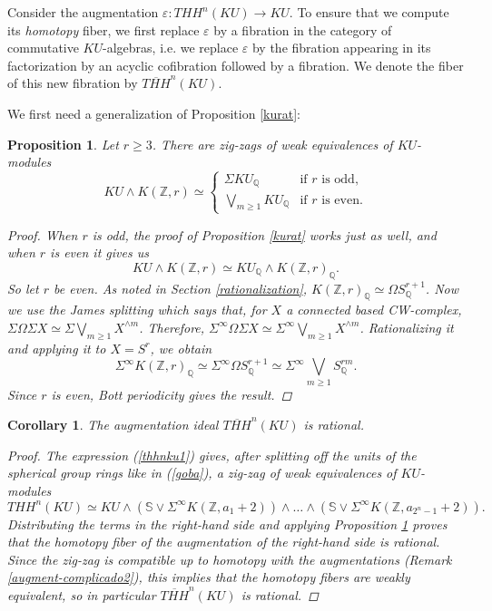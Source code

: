 \documentclass[a4paper,11pt]{amsart} %
\renewcommand{\epsilon}{\varepsilon}
\theoremstyle{definition} \newtheorem{defn}[equation]{Definition}
\theoremstyle{remark} \newtheorem{notation}[equation]{Notation}
\theoremstyle{plain} \newtheorem{teo}[equation]{Theorem}
\theoremstyle{plain} \newtheorem{lema}[equation]{Lemma}
\theoremstyle{plain} \newtheorem{prop}[equation]{Proposition}
\theoremstyle{plain} \newtheorem{corolario}[equation]{Corollary}
\theoremstyle{remark} \newtheorem{obs}[equation]{Remark}
\theoremstyle{remark} \newtheorem{sideobs}[equation]{Side remark}
\theoremstyle{remark} \newtheorem{ejercicio}[equation]{Exercise}
\theoremstyle{definition} \newtheorem{notn}[equation]{Notation}
\theoremstyle{remark} \newtheorem{ej}[equation]{Example}
\theoremstyle{remark} \newtheorem{contraej}[equation]{Counterexample}
\theoremstyle{plain} \newtheorem{conj}[equation]{Conjecture}
\renewcommand{\1}{\ensuremath{\mathbbm{1}}}
\newcommand{\Q}{\mathbb{Q}}
\renewcommand{\S}{\mathbb{S}}
\newcommand{\Z}{\mathbb{Z}}
\newcommand{\bprf}{\begin{proof}}
\newcommand{\eprf}{\end{proof}}
\newcommand{\bcor}{\begin{corolario}}
\newcommand{\ecor}{\end{corolario}}
\numberwithin{equation}{section}
\begin{document}
Consider the augmentation $\epsilon:THH^n(KU)\to KU$. To ensure that we compute its \emph{homotopy} fiber, we first replace $\epsilon$ by a fibration in the category of commutative $KU$-algebras, i.e. we replace $\epsilon$ by the fibration appearing in its factorization by an acyclic cofibration followed by a fibration. We denote the fiber of this new fibration by $\overline{THH}^n(KU)$.


%
%
%
%
%
%
%
%
%



We first need a generalization of Proposition \ref{kurat}:

\begin{prop} \label{lemgen} Let $r\geq 3$. There are zig-zags of weak equivalences of $KU$-modules
\[KU \wedge K(\Z,r) \simeq \begin{cases} \Sigma KU_\Q & \text{if } r \text{ is odd}, \\ \bigvee\limits_{m\geq 1} KU_\Q & \text{if } r \text{ is even}.\end{cases}\]
\bprf When $r$ is odd, the proof of Proposition \ref{kurat} works just as well, and when $r$ is even it gives us
\[KU \wedge K(\Z,r) \simeq KU_\Q \wedge K(\Z,r)_\Q.\]
So let $r$ be even. As noted in Section \ref{rationalization}, $K(\Z,r)_\Q \simeq \Omega S^{r+1}_\Q$. Now we use the James splitting which says that, for $X$ a connected based CW-complex, $\Sigma \Omega \Sigma X \simeq \Sigma \bigvee_{m\geq 1} X^{\wedge m}$. %
Therefore, %
$\Sigma^\infty \Omega \Sigma X \simeq \Sigma^\infty \bigvee_{m\geq 1} X^{\wedge m}$. Rationalizing it and applying it to $X=S^r$, we obtain
\[\Sigma^\infty K(\Z,r)_\Q \simeq \Sigma^\infty \Omega S^{r+1}_\Q \simeq \Sigma^\infty \bigvee_{m\geq 1} S^{rm}_\Q.\] 
Since $r$ is even, Bott periodicity gives the result.
\eprf
\end{prop}

\bcor \label{hocs} The augmentation ideal $\overline{THH}^n(KU)$ is rational.
\bprf The expression (\ref{thhnku1}) gives, after splitting off the units of the spherical group rings like in (\ref{goba}), a zig-zag of weak equivalences of $KU$-modules
\begin{equation} \label{kol} THH^n(KU) \simeq KU \wedge (\S \vee \Sigma^\infty K(\Z,a_1+2)) \wedge \dots \wedge  (\S \vee \Sigma^\infty K(\Z,a_{2^n-1}+2)). \end{equation}
%
Distributing the terms in the right-hand side and applying Proposition \ref{lemgen} proves that the homotopy fiber of the augmentation of the right-hand side is rational. 
Since the zig-zag is compatible up to homotopy with the augmentations (Remark \ref{augment-complicado2}), this implies that the homotopy fibers are weakly equivalent, so in particular $\overline{THH}^n(KU)$ is rational.
\eprf
\ecor
\end{document}
